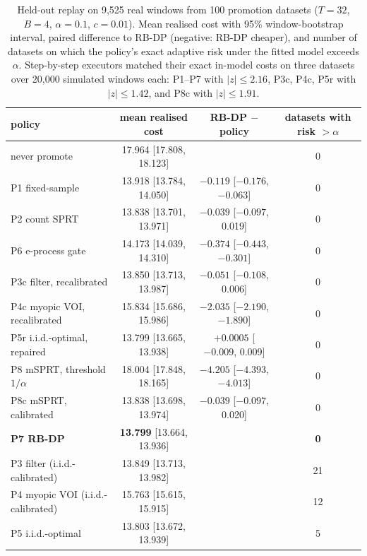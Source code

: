 \documentclass{article}
\theoremstyle{plain}
\theoremstyle{definition}
\theoremstyle{remark}
\begin{document}
\begin{table}[t]
\centering
\caption{Held-out replay on 9{,}525 real windows from 100 promotion datasets ($T=32$, $B=4$, $\alpha=0.1$, $c=0.01$). Mean realised cost with 95\% window-bootstrap interval, paired difference to RB-DP (negative: RB-DP cheaper), and number of datasets on which the policy's exact adaptive risk under the fitted model exceeds $\alpha$. Step-by-step executors matched their exact in-model costs on three datasets over 20{,}000 simulated windows each: P1--P7 with $|z|\le2.16$, P3c, P4c, P5r with $|z|\le1.42$, and P8c with $|z|\le1.91$.}
\label{tab:replay}
\small
\begin{tabular}{lccc}
\toprule
policy & mean realised cost & RB-DP $-$ policy & datasets with risk $>\alpha$\\
\midrule
never promote & 17.964 [17.808, 18.123] & & 0\\
P1 fixed-sample & 13.918 [13.784, 14.050] & $-0.119$ [$-0.176$, $-0.063$] & 0\\
P2 count SPRT & 13.838 [13.701, 13.971] & $-0.039$ [$-0.097$, 0.019] & 0\\
P6 e-process gate & 14.173 [14.039, 14.310] & $-0.374$ [$-0.443$, $-0.301$] & 0\\
P3c filter, recalibrated & 13.850 [13.713, 13.987] & $-0.051$ [$-0.108$, 0.006] & 0\\
P4c myopic VOI, recalibrated & 15.834 [15.686, 15.986] & $-2.035$ [$-2.190$, $-1.890$] & 0\\
P5r i.i.d.-optimal, repaired & 13.799 [13.665, 13.938] & $+0.0005$ [$-0.009$, 0.009] & 0\\
P8 mSPRT, threshold $1/\alpha$ & 18.004 [17.848, 18.165] & $-4.205$ [$-4.393$, $-4.013$] & 0\\
P8c mSPRT, calibrated & 13.838 [13.698, 13.974] & $-0.039$ [$-0.097$, 0.020] & 0\\
\textbf{P7 RB-DP} & \textbf{13.799} [13.664, 13.936] & & \textbf{0}\\
\midrule
P3 filter (i.i.d.-calibrated) & 13.849 [13.713, 13.982] & & 21\\
P4 myopic VOI (i.i.d.-calibrated) & 15.763 [15.615, 15.915] & & 12\\
P5 i.i.d.-optimal & 13.803 [13.672, 13.939] & & 5\\
\bottomrule
\end{tabular}
\end{table}
\end{document}
